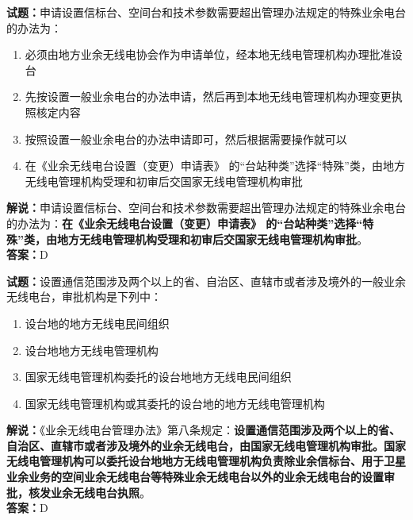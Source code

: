 \documentclass{ctexbook}
\begin{document}
\noindent\textbf{试题：}申请设置信标台、空间台和技术参数需要超出管理办法规定的特殊业余电台的办法为：
\begin{enumerate}[leftmargin=3em]
\item 必须由地方业余无线电协会作为申请单位，经本地无线电管理机构办理批准设台
\item 先按设置一般业余电台的办法申请，然后再到本地无线电管理机构办理变更执照核定内容
\item 按照设置一般业余电台的办法申请即可，然后根据需要操作就可以
\item 在《业余无线电台设置（变更）申请表》 的“台站种类”选择“特殊”类，由地方无线电管理机构受理和初审后交国家无线电管理机构审批
\end{enumerate}
\noindent\textbf{解说：}申请设置信标台、空间台和技术参数需要超出管理办法规定的特殊业余电台的办法为：\textbf{在《业余无线电台设置（变更）申请表》 的“台站种类”选择“特殊”类，由地方无线电管理机构受理和初审后交国家无线电管理机构审批}。\\\noindent\textbf{答案：}D



\bigskip


\noindent\textbf{试题：}设置通信范围涉及两个以上的省、自治区、直辖市或者涉及境外的一般业余无线电台，审批机构是下列中：
\begin{enumerate}[leftmargin=3em]
\item 设台地的地方无线电民间组织
\item 设台地地方无线电管理机构
\item 国家无线电管理机构委托的设台地地方无线电民间组织
\item 国家无线电管理机构或其委托的设台地的地方无线电管理机构
\end{enumerate}
\noindent\textbf{解说：}《业余无线电台管理办法》第八条规定：\textbf{设置通信范围涉及两个以上的省、自治区、直辖市或者涉及境外的业余无线电台，由国家无线电管理机构审批。国家无线电管理机构可以委托设台地地方无线电管理机构负责除业余信标台、用于卫星业余业务的空间业余无线电台等特殊业余无线电台以外的业余无线电台的设置审批，核发业余无线电台执照}。\\\noindent\textbf{答案：}D

\bigskip
\end{document}
